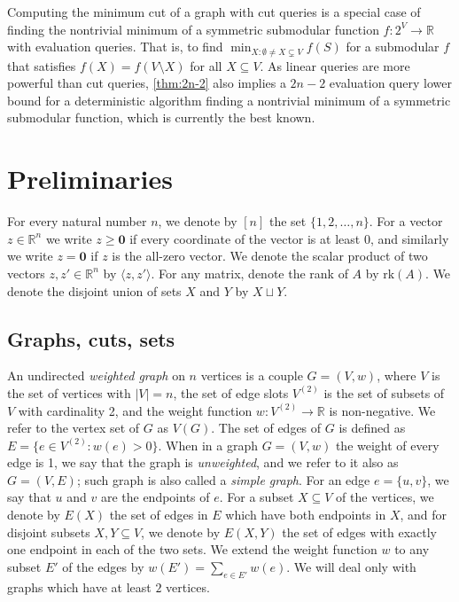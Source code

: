 \documentclass[10pt,a4paper]{article}
\newcommand{\R}{\mathbb{R}}
\newcommand{\braket}[2]{\langle#1, #2\rangle}
\newcommand{\rk}{\mathrm{rk}}
\newcommand{\1}{\mathbf{1}}
\theoremstyle{definition}
\begin{document}
Computing the minimum cut of a graph with cut queries is a special case of finding the nontrivial minimum of a symmetric submodular function $f:2^V \rightarrow \R$ with evaluation queries.  That is,
to find $\min_{X: \emptyset \ne X \subsetneq V} f(S)$ for a submodular $f$ that satisfies $f(X) = f(V \setminus X)$ for all $X \subseteq V$.  As linear queries are more powerful than cut queries, \cref{thm:2n-2} also
implies a $2n-2$ evaluation query lower bound for a deterministic algorithm finding a nontrivial minimum of a symmetric submodular function, which is currently the best known.

\setcounter{theorem}{3}\section{Preliminaries}\label{sec:prelim}

For every natural number $n$, we denote by $[n]$ the set
$\{1,2, \ldots, n\}$.
For a vector $z \in \R^n$ we write $z \geq \mathbf{0}$ if every coordinate of the vector
is at least 0, and similarly we write $z = \mathbf{0}$ if $z$ is the all-zero vector.
We denote the scalar product of two vectors $z,z' \in \R^n$
by $\braket{{z}}{z'}$. For any matrix, denote the rank of $A$ by $\rk(A)$.
We denote the disjoint union of sets $X$ and $Y$ by $X \sqcup Y.$

\subsection{Graphs, cuts, sets}

An undirected {\em weighted graph} on $n$ vertices is a couple
$G = (V,w)$, where $V$ is the set of vertices with $|V| = n$,
the set of edge slots
$V^{(2)}$ is the
set of subsets of $V$ with cardinality 2, and the weight function
$w : V^{(2)} \rightarrow \R $ is non-negative. We refer to the vertex set of $G$ as $V(G)$.
The set of edges of $G$
is defined as $E = \{e \in V^{(2)} : w(e) > 0\}$.
When in a graph $G=(V,w)$ the weight of every edge is 1, we say that the graph is {\em unweighted},
and we refer to it also as $G=(V,E)$; such graph is also called a {\em simple graph}.
For an edge $e = \{u,v\} $, we say that $u$ and $v$ are the endpoints of $e$.
For a subset $X \subseteq V$ of the vertices, we denote by $E(X)$ the set of edges in $E$
which have both endpoints in $X$, and for disjoint subsets $X, Y \subseteq V$, we denote by
$E(X, Y)$ the set of edges with exactly one endpoint in each of the two sets.
We extend the weight function $w$ to any subset $E'$ of the edges by $w(E') = \sum_{e \in E'} w(e)$.
We will deal only with graphs which have at least $2$ vertices.
\end{document}
